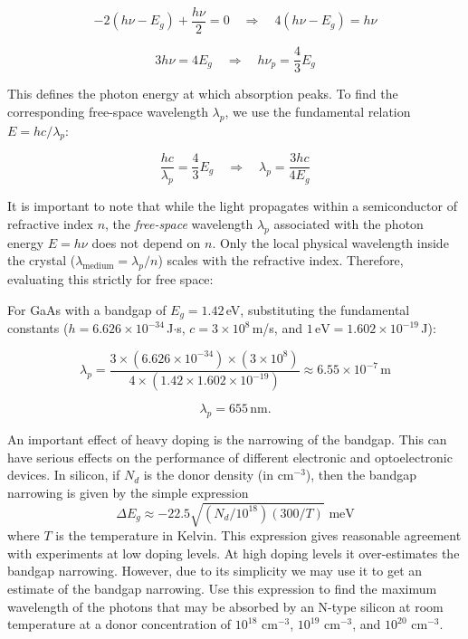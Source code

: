 \begin{equation*}
  -2(h\nu - E_g) + \frac{h\nu}{2} = 0 \quad\Longrightarrow\quad 4(h\nu - E_g) = h\nu
\end{equation*}

\begin{equation*}
  3h\nu = 4E_g \quad\Longrightarrow\quad h\nu_p = \frac{4}{3} E_g
\end{equation*}

This defines the photon energy at which absorption peaks. To find the corresponding free-space wavelength $\lambda_p$, we use the fundamental relation $E = hc/\lambda_p$:

\begin{equation*}
  \frac{hc}{\lambda_p} = \frac{4}{3} E_g \quad\Longrightarrow\quad \lambda_p = \frac{3hc}{4E_g}
\end{equation*}

It is important to note that while the light propagates within a semiconductor of refractive index $n$, the \emph{free-space} wavelength $\lambda_p$ associated with the photon energy $E = h\nu$ does not depend on $n$. Only the local physical wavelength inside the crystal ($\lambda_{\text{medium}} = \lambda_p / n$) scales with the refractive index. Therefore, evaluating this strictly for free space:

For GaAs with a bandgap of $E_g = 1.42$\,eV, substituting the fundamental constants ($h = 6.626 \times 10^{-34}$\,J$\cdot$s, $c = 3 \times 10^8$\,m/s, and $1\,\text{eV} = 1.602 \times 10^{-19}$\,J):

\begin{equation*}
  \lambda_p = \frac{3 \times (6.626 \times 10^{-34}) \times (3 \times 10^8)}{4 \times (1.42 \times 1.602 \times 10^{-19})} \approx 6.55 \times 10^{-7}\,\text{m}
\end{equation*}

\begin{equation*}
  \boxed{\lambda_p = 655\,\text{nm}.}
\end{equation*}

\begin{question}[Question 8]
An important effect of heavy doping is the narrowing of the bandgap. This can have serious effects on the performance of different electronic and optoelectronic devices. In silicon, if $N_d$ is the donor density (in cm$^{-3}$), then the bandgap narrowing is given by the simple expression
\begin{equation*}
\Delta E_g \approx -22.5\sqrt{(N_d/10^{18})(300/T)} \text{ meV}
\end{equation*}
where $T$ is the temperature in Kelvin. This expression gives reasonable agreement with experiments at low doping levels. At high doping levels it over-estimates the bandgap narrowing. However, due to its simplicity we may use it to get an estimate of the bandgap narrowing. Use this expression to find the maximum wavelength of the photons that may be absorbed by an N-type silicon at room temperature at a donor concentration of $10^{18}$ cm$^{-3}$, $10^{19}$ cm$^{-3}$, and $10^{20}$ cm$^{-3}$.
\end{question}

